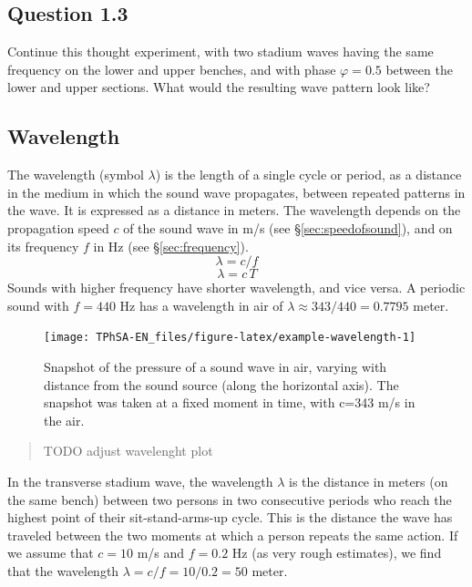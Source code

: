 \documentclass[
]{book}
\begin{document}
\label{questions-phase}
\subsection*{Question 1.3}\label{question-1.3}

Continue this thought experiment, with two stadium waves having the same frequency on the lower and upper benches, and with phase \(\varphi=0.5\) between the lower and upper sections. What would the resulting wave pattern look like?

\subsection{Wavelength}\label{sec:wavelength}

The wavelength (symbol \(\lambda\)) is the length of a single cycle or period, as a distance in the medium in which the sound wave propagates, between repeated patterns in the wave. It is expressed as a distance in meters. The wavelength depends on the propagation speed \(c\) of the sound wave in m/s (see §\ref{sec:speedofsound}), and on its frequency \(f\) in Hz (see §\ref{sec:frequency}).
\[\lambda = c / f\]
\[\lambda = c \, T\]
Sounds with higher frequency have shorter wavelength, and vice versa. A periodic sound with \(f=440\) Hz has a wavelength in air of \(\lambda \approx 343/440 = 0.7795\) meter.

\begin{figure}

{\centering \texttt{[image: TPhSA-EN\_files/figure-latex/example-wavelength-1]} 

}

\caption{Snapshot of the pressure of a sound wave in air, varying with distance from the sound source (along the horizontal axis). The snapshot was taken at a fixed moment in time, with c=343 m/s in the air. }\label{fig:example-wavelength}
\end{figure}

\begin{quote}
TODO adjust wavelenght plot
\end{quote}

In the transverse stadium wave, the wavelength \(\lambda\) is the distance in meters (on the same bench) between two persons in two consecutive periods who reach the highest point of their sit-stand-arms-up cycle. This is the distance the wave has traveled between the two moments at which a person repeats the same action. If we assume that \(c=10\) m/s and \(f=0.2\) Hz (as very rough estimates), we find that the wavelength \(\lambda=c/f=10/0.2=50\) meter.
\end{document}
